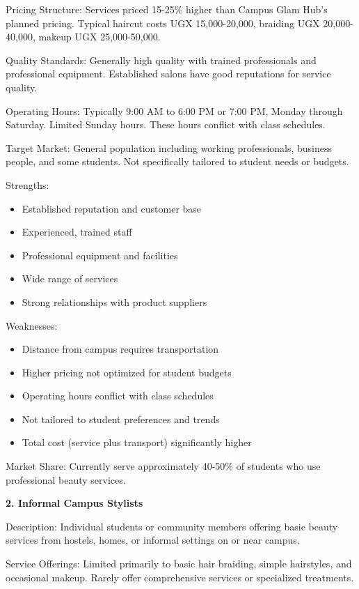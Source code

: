 Pricing Structure: Services priced 15-25\% higher than Campus Glam Hub's planned pricing. Typical haircut costs UGX 15,000-20,000, braiding UGX 20,000-40,000, makeup UGX 25,000-50,000.

Quality Standards: Generally high quality with trained professionals and professional equipment. Established salons have good reputations for service quality.

Operating Hours: Typically 9:00 AM to 6:00 PM or 7:00 PM, Monday through Saturday. Limited Sunday hours. These hours conflict with class schedules.

Target Market: General population including working professionals, business people, and some students. Not specifically tailored to student needs or budgets.

Strengths:
\begin{itemize}[leftmargin=2em]
    \item Established reputation and customer base
    \item Experienced, trained staff
    \item Professional equipment and facilities
    \item Wide range of services
    \item Strong relationships with product suppliers
\end{itemize}

Weaknesses:
\begin{itemize}[leftmargin=2em]
    \item Distance from campus requires transportation
    \item Higher pricing not optimized for student budgets
    \item Operating hours conflict with class schedules
    \item Not tailored to student preferences and trends
    \item Total cost (service plus transport) significantly higher
\end{itemize}

Market Share: Currently serve approximately 40-50\% of students who use professional beauty services.

\textbf{2. Informal Campus Stylists}

Description: Individual students or community members offering basic beauty services from hostels, homes, or informal settings on or near campus.

Service Offerings: Limited primarily to basic hair braiding, simple hairstyles, and occasional makeup. Rarely offer comprehensive services or specialized treatments.


